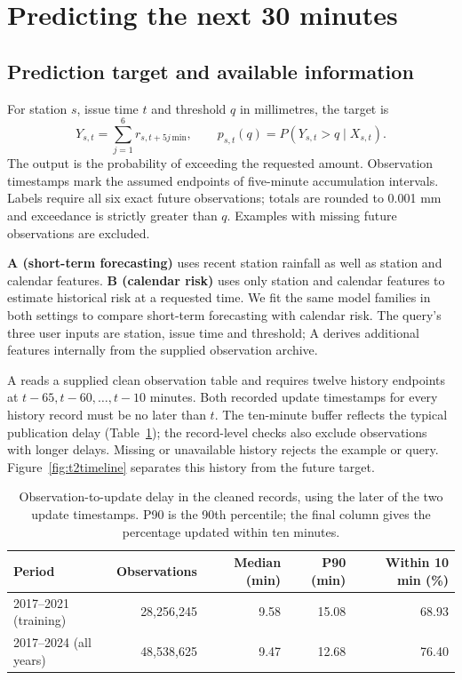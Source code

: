 \section{Predicting the next 30 minutes}
\subsection{Prediction target and available information}
For station $s$, issue time $t$ and threshold $q$ in millimetres, the target is
\[
Y_{s,t}=\sum_{j=1}^{6}r_{s,t+5j\,\mathrm{min}},\qquad
p_{s,t}(q)=P(Y_{s,t}>q\mid X_{s,t}).
\]
The output is the probability of exceeding the requested amount. Observation timestamps mark the assumed endpoints of five-minute accumulation intervals. Labels require all six exact future observations; totals are rounded to 0.001 mm and exceedance is strictly greater than $q$. Examples with missing future observations are excluded.

\textbf{A (short-term forecasting)} uses recent station rainfall as well as station and calendar features. \textbf{B (calendar risk)} uses only station and calendar features to estimate historical risk at a requested time. We fit the same model families in both settings to compare short-term forecasting with calendar risk. The query's three user inputs are station, issue time and threshold; A derives additional features internally from the supplied observation archive.

A reads a supplied clean observation table and requires twelve history endpoints at $t-65,t-60,\ldots,t-10$ minutes. Both recorded update timestamps for every history record must be no later than $t$. The ten-minute buffer reflects the typical publication delay (Table~\ref{tab:updatedelay}); the record-level checks also exclude observations with longer delays. Missing or unavailable history rejects the example or query. Figure~\ref{fig:t2timeline} separates this history from the future target.

\begin{table}[htbp]\centering\small
\begin{tabular}{lrrrr}\toprule
Period & Observations & Median (min) & P90 (min) & Within 10 min (\%)\\\midrule
2017--2021 (training) & 28,256,245 & 9.58 & 15.08 & 68.93 \\
2017--2024 (all years) & 48,538,625 & 9.47 & 12.68 & 76.40 \\
\bottomrule\end{tabular}
\caption{Observation-to-update delay in the cleaned records, using the later of the two update timestamps. P90 is the 90th percentile; the final column gives the percentage updated within ten minutes.}
\label{tab:updatedelay}
\end{table}

